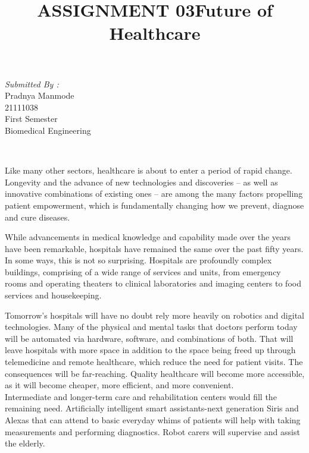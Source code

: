 \documentclass[12pt]{article}
\begin{document}
\begin{titlepage}
\begin{minipage}{0.4\textwidth}
			\begin{flushright} \large
			\emph{Submitted By :} \\
			Pradnya Manmode\\
            21111038\\
        First Semester\\
        Biomedical Engineering\\
		\end{flushright}
        
	\end{minipage}\\[2 cm]
	
	
    
    
    
    
	
\end{titlepage}


\title{ASSIGNMENT 03}
\maketitle

\indent

\title{\LARGE \textbf {Future of Healthcare} }
\maketitle

\indent
Like many other sectors, healthcare is about to enter a period of rapid change. Longevity and the advance of new technologies and discoveries – as well as innovative combinations of existing ones – are among the many factors propelling patient empowerment, which is fundamentally changing how we prevent, diagnose and cure diseases.

\indent
While advancements in medical knowledge and capability made over the years have been remarkable, hospitals have remained the same over the past fifty years.
In some ways, this is not so surprising. Hospitals are profoundly complex buildings, comprising of a wide range of services and units, from emergency rooms and operating theaters to clinical laboratories and imaging centers to food services and housekeeping. 

\indent
Tomorrow’s hospitals will have no doubt rely more heavily on robotics and digital technologies. Many of the physical and mental tasks that doctors perform today will be automated via hardware, software, and combinations of both. That will leave hospitals with more space in addition to the space being freed up through telemedicine and remote healthcare, which reduce the need for patient visits. The consequences will be far-reaching. Quality healthcare will become more accessible, as it will become cheaper, more efficient, and more convenient.
\\
Intermediate and longer-term care and rehabilitation centers would fill the remaining need. Artificially intelligent smart assistants-next generation  Siris and Alexas that can attend to basic everyday whims of patients will help with taking measurements and performing diagnostics. Robot carers will supervise and assist the elderly. 
\end{document}
